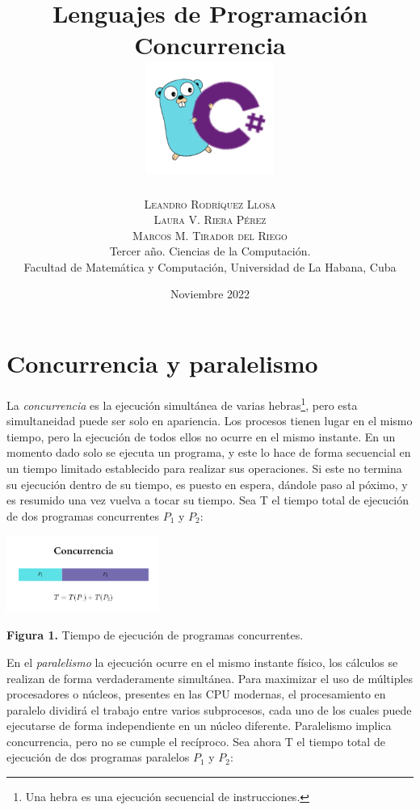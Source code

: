 \documentclass[10pt]{article} %
\title{\normalsize{Lenguajes de Programaci\'on}\\
\Huge\bfseries Concurrencia\\
\includegraphics[height=5em]{go_cs_logo.png}} %
\author{%
\normalsize\textsc{Leandro Rodr\'iquez Llosa}\\
\normalsize\textsc{Laura V. Riera P\'erez}\\ 
\normalsize\textsc{Marcos M. Tirador del Riego} \\[2ex]
\small Tercer a\~no. Ciencias de la Computaci\'on. \\ %
\small Facultad de Matem\'atica y Computaci\'on, Universidad de La Habana, Cuba \\ %
}
\date{\footnotesize Noviembre 2022 } %
\newcommand{\imgcaption}[2]{\tiny \textbf{Figura #1.} #2.}
\begin{document}
\maketitle


\section{Concurrencia y paralelismo}

La \textit{concurrencia} es la ejecuci\'on simult\'anea de varias hebras\footnote{Una hebra es una ejecuci\'on secuencial de instrucciones.}, pero esta simultaneidad puede ser solo en apariencia. Los procesos tienen lugar en el mismo tiempo, pero la ejecución de todos ellos no ocurre en el mismo instante. En un momento dado solo se ejecuta un programa, y este lo hace de forma secuencial en un tiempo limitado establecido para realizar sus operaciones. Si este no termina su ejecuci\'on dentro de su tiempo, es puesto en espera, d\'andole paso al p\'oximo, y es resumido una vez vuelva a tocar su tiempo. Sea T el tiempo total de ejecuci\'on de dos programas concurrentes $ P_{1} $ y $ P_{2} $: 

\begin{center}
	\includegraphics[width=5cm]{concurrencia.png}
	
	\imgcaption{1}{Tiempo de ejecuci\'on de programas concurrentes}
\end{center}

En el \textit{paralelismo} la ejecución ocurre en el mismo instante físico, los c\'alculos se realizan de forma verdaderamente simult\'anea. Para maximizar el uso de múltiples procesadores o n\'ucleos, presentes en las CPU modernas, el procesamiento en paralelo dividirá el trabajo entre varios subprocesos, cada uno de los cuales puede ejecutarse de forma independiente en un núcleo diferente. Paralelismo implica concurrencia, pero no se cumple el rec\'iproco. Sea ahora T el tiempo total de ejecuci\'on de dos programas paralelos $ P_{1} $ y $ P_{2} $:
\end{document}
